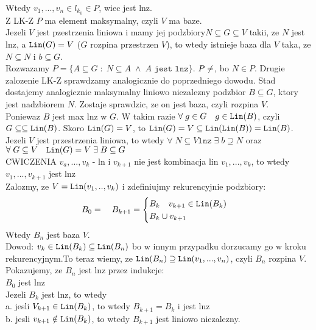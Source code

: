 \documentclass{article}
\begin{document}
    Wtedy $v_1, ..., v_n\in l_{k_0}\in P$, wiec jest lnz.\smallskip\\
    Z LK-Z $P$ ma element maksymalny, czyli $V$ ma baze.\bigskip\\
    Jezeli $V$ jest pzestrzenia liniowa i mamy jej podzbiory$N\subseteq G\subseteq V$ takii, ze $N$ jest lnz, a $\texttt{Lin}(G)=V$ ($G$ rozpina przestrzen $V$), to wtedy istnieje baza dla $V$ taka, ze $N\subseteq N$ i $b\subseteq G$.\medskip\\
    Rozwazamy $P=\{A\subseteq G\;:\;N\subseteq A\;\land\;A\texttt{ jest lnz}\}$. $P\neq\empty$, bo $N\in P$. Drugie zalozenie LK-Z sprawdzamy analogicznie do poprzedniego dowodu. Stad dostajemy analogicznie maksymalny liniowo niezalezny podzbior $B\subseteq G$, ktory jest nadzbiorem $N$. Zostaje sprawdzic, ze on jest baza, czyli rozpina $V$.\smallskip\\
    Poniewaz $B$ jest max lnz w $G$. W takim razie $\forall\;g\in G\quad g\in\texttt{Lin}(B)$, czyli $G\subseteq\subseteq\texttt{Lin}(B)$. Skoro $\texttt{Lin}(G)=V$, to $\texttt{Lin}(G)=V\subseteq\texttt{Lin}(\texttt{Lin}(B))=\texttt{Lin}(B)$.\bigskip\\
    Jezeli $V$ jest przestrzenia liniowa, to wtedy $\forall\;N\subseteq V \texttt{lnz}\;\exists\; b\supseteq N$ oraz $\forall\;G\subseteq V\quad\texttt{Lin}(G)=V\;\exists\;B\subseteq G$\bigskip\\
    \color{tit}CWICZENIA \color{txt}$v_a, ..., v_k$ - ln i $v_{k+1}$ nie jest kombinacja lin $v_1, ..., v_k$, to wtedy $v_1, ..., v_{k+1}$ jest lnz\medskip\\
    Zalozmy, ze $V=\texttt{Lin}(v_1, .., v_k)$ i zdefiniujmy rekurencyjnie podzbiory:
    $$B_0=\empty\quad B_{k+1}=\begin{cases}B_k\quad v_{k+1}\in\Lin{B_k}\\B_k\cup v_{k+1}\end{cases}$$
    Wtedy $B_n$ jest baza $V$.\medskip\\
    Dowod: $v_k\in\texttt{Lin}({B_k})\subseteq\texttt{Lin}(B_n)$ bo w innym przypadku dorzucamy go w kroku rekurencyjnym.To teraz wiemy, ze $\texttt{Lin}(B_n)\supseteq\texttt{Lin}(v_1, ..., v_n)$, czyli $B_n$ rozpina $V$.\\
    Pokazujemy, ze $B_n$ jest lnz przez indukcje:\\
    $B_0$ jest lnz\\
    Jezeli $B_k$ jest lnz, to wtedy\\
    a. jesli $V_{k+1}\in\texttt{Lin}(B_k)$, to wtedy $B_{k+1}=B_k$ i jest lnz\\
    b. jesli $v_{k+1}\notin \texttt{Lin}(B_k)$, to wtedy $B_{k+1}$ jest liniowo niezalezny. 
\end{document}
